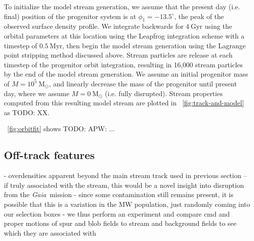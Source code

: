 \documentclass[modern]{aastex62}
\newcommand{\gaia}{\textsl{Gaia}}
\newcommand{\msun}{\textrm{M}_\odot}
\newcommand{\todo}[1]{{\color{red} TODO: #1}}
\begin{document}
To initialize the model stream generation, we assume that the present day (i.e.
final) position of the progenitor system is at $\phi_1 = -13.5^\circ$, the peak
of the observed surface density profile.
We integrate backwards for $4~\textrm{Gyr}$ using the orbital parameters at this
location using the Leapfrog integration scheme with a timestep of
$0.5~\textrm{Myr}$, then begin the model stream generation using the Lagrange
point stripping method discussed above.
Stream particles are release at each timestep of the progenitor orbit
integration, resulting in 16,000 stream particles by the end of the model stream
generation.
We assume an initial progenitor mass of $M=10^5~\msun$, and linearly decrease
the mass of the progenitor until present day, where we assume $M = 0~\msun$
(i.e. fully disrupted).
Stream properties computed from this resulting model stream are plotted in
\figurename~\ref{fig:track-and-model} as \todo{XX}.

\figurename~\ref{fig:orbitfit} shows \todo{APW: ...}


\subsection{Off-track features}
\label{sec:res_gap}

- overdensities apparent beyond the main stream track used in previous section -- if truly associated with the stream, this would be a novel insight into disruption from the \gaia\ mission
- since some contamination still remains present, it is possible that this is a variation in the MW population, just randomly coming into our selection boxes
- we thus perform an experiment and compare cmd and proper motions of spur and blob fields to stream and background fields to see which they are associated with
\end{document}
